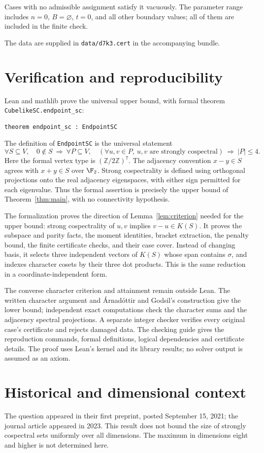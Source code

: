 Cases with no admissible assignment satisfy it vacuously.
The parameter range includes $n=0$, $B=\varnothing$, $t=0$, and all
other boundary values; all of them are included in the finite check.



The data are supplied in
\texttt{data/d7k3.cert} in the accompanying bundle.


\section{Verification and reproducibility}\label{sec:formal}
Lean and mathlib prove the universal upper bound, with formal theorem
\texttt{CubelikeSC.endpoint\_sc}:
\begin{verbatim}
theorem endpoint_sc : EndpointSC
\end{verbatim}
The definition of \texttt{EndpointSC} is the universal statement
\[
 \forall S\subseteq V,\quad 0\notin S\ \Longrightarrow\
 \forall P\subseteq V,\quad
 (\forall u,v\in P,\ u,v\text{ are strongly cospectral})
 \ \Longrightarrow\ |P|\leq4.
\]
Here the formal vertex type is $(\mathbb Z/2\mathbb Z)^7$.
The adjacency convention $x-y\in S$ agrees with $x+y\in S$ over
$\F_2$. Strong cospectrality is defined using orthogonal projections
onto the real adjacency eigenspaces, with either sign permitted for
each eigenvalue. Thus the formal assertion is precisely the upper bound
of Theorem~\ref{thm:main}, with no connectivity hypothesis.

The formalization proves the direction of
Lemma~\ref{lem:criterion} needed for the upper bound:
strong cospectrality of $u,v$ implies $v-u\in K(S)$.
It proves the subspace and parity facts, the moment identities, bracket
extraction, the penalty bound, the finite certificate checks, and their
case cover. Instead of changing basis, it selects three independent
vectors of $K(S)$ whose span contains $\sigma$, and indexes character
cosets by their three dot products. This is the same reduction in a
coordinate-independent form.

The converse character criterion and attainment remain outside Lean.
The written character argument and \'Arnad\'ottir and Godsil's construction
give the lower bound; independent exact computations check the character
sums and the adjacency spectral projections. A separate integer checker
verifies every original case's certificate and rejects damaged data.
The checking guide gives the reproduction commands, formal definitions,
logical dependencies and certificate details. The proof uses Lean's
kernel and its library results; no solver output is assumed as an axiom.



\section{Historical and dimensional context}
The question appeared in their first preprint, posted September 15, 2021;
the journal article appeared in 2023.
This result does not bound the size of strongly cospectral sets uniformly
over all dimensions. The maximum in dimensions eight and higher is not determined
here.
